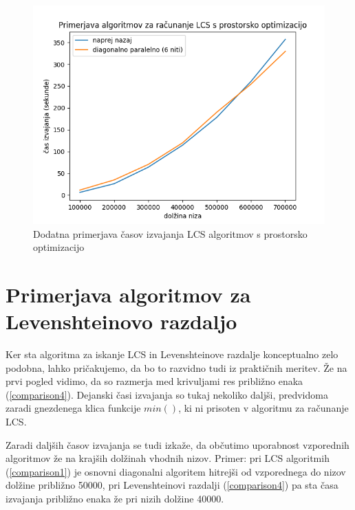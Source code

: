 \documentclass[a4paper,12pt,openright]{book}
\begin{document}
\begin{figure}[htb]
\begin{center}
\includegraphics[width=1.0\textwidth]{plots/LCSextended.png}
\end{center}
\caption{Dodatna primerjava časov izvajanja LCS algoritmov s prostorsko optimizacijo}
\label{comparison3}
\end{figure}

\section{Primerjava algoritmov za Levenshteinovo razdaljo}

Ker sta algoritma za iskanje LCS in Levenshteinove razdalje konceptualno zelo podobna, lahko pričakujemo, da bo to razvidno tudi iz praktičnih meritev. Že na prvi pogled vidimo, da so razmerja med krivuljami res približno enaka (\ref{comparison4}). Dejanski časi izvajanja so tukaj nekoliko daljši, predvidoma zaradi gnezdenega klica funkcije $min()$, ki ni prisoten v algoritmu za računanje LCS. 

Zaradi daljših časov izvajanja se tudi izkaže, da občutimo uporabnost vzporednih algoritmov že na krajših dolžinah vhodnih nizov. Primer: pri LCS algoritmih (\ref{comparison1}) je osnovni diagonalni algoritem hitrejši od vzporednega do nizov dolžine približno 50000, pri Levenshteinovi razdalji (\ref{comparison4}) pa sta časa izvajanja približno enaka že pri nizih dolžine 40000. 
\end{document}
